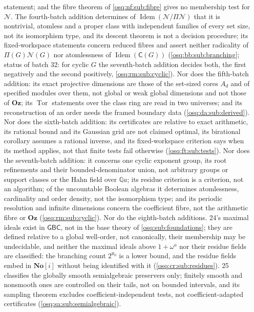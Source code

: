 \documentclass[11pt,letterpaper]{article}
\numberwithin{equation}{section}
\theoremstyle{definition}
\theoremstyle{remark}
\theoremstyle{plain}
\newcommand{\No}{\mathbf{No}}
\newcommand{\Oz}{\mathbf{Oz}}
\newcommand{\SC}{\No[i]}
\newcommand{\Q}{\mathbb Q}
\newcommand{\NN}{\mathcal N}         %
\newcommand{\Tor}{\operatorname{Tor}}
\newcommand{\Idem}{\operatorname{Idem}}
\begin{document}
statement; and the fibre theorem of \cref{osq:nf:sub:fibre} gives no membership test for $\NN$. The fourth-batch addition
determines of $\Idem(\NN/\Pi\NN)$ that it is nontrivial, atomless and a proper class with independent families of every set size,
not its isomorphism type, and its descent theorem is not a decision procedure; its fixed-workspace statements concern reduced
fibres and assert neither radicality of $\Pi(G)\NN(G)$ nor atomlessness of $\Idem(\mathsf C(G))$ (\cref{osq:bb:sub:branching}; status of batch 32:
for cyclic $G$ the seventh-batch addition decides both, the first negatively and the second positively, \cref{osq:rm:sub:cyclic}).
Nor does the fifth-batch addition: its exact projective dimensions are those of the set-sized cores $A_d$ and of specified modules over
them, not global or weak global dimensions and not those of $\Oz$; its $\Tor$ statements over the class ring are read in two universes;
and its reconstruction of an order needs the framed boundary data (\cref{osq:da:sub:derived}).
Nor does the sixth-batch addition: its certificates are relative to exact arithmetic, its rational bound and its Gaussian grid are not claimed
optimal, its birational corollary assumes a rational inverse, and its fixed-workspace criterion says when its method applies, not that finite
tests fail otherwise (\cref{osq:ft:sub:tests}).
Nor does the seventh-batch addition: it concerns one cyclic exponent group, its root refinements and their bounded-denominator union, not
arbitrary groups or support classes or the Hahn field over $\Q a$; its residue criterion is a criterion, not an algorithm; of the uncountable
Boolean algebras it determines atomlessness, cardinality and order density, not the isomorphism type; and its periodic resolution and infinite
dimensions concern the coefficient fibre, not the arithmetic fibre or $\Oz$ (\cref{osq:rm:sub:cyclic}).
Nor do the eighth-batch additions. 24's maximal ideals exist in $\mathsf{GBC}$, not in the base theory of \cref{osq:sub:foundations}; they are
defined relative to a global well-order, not canonically, their membership may be undecidable, and neither the maximal ideals above $1+\omega^a$ nor
their residue fields are classified: the branching count $2^{\aleph_0}$ is a lower bound, and the residue fields embed in $\SC$ without being
identified with it (\cref{osq:cr:sub:residues}). 25 classifies the globally smooth semialgebraic preservers only; finitely smooth and nonsmooth ones
are controlled on their tails, not on bounded intervals, and its sampling theorem excludes coefficient-independent tests, not coefficient-adapted
certificates (\cref{osq:sa:sub:semialgebraic}).
\end{document}

